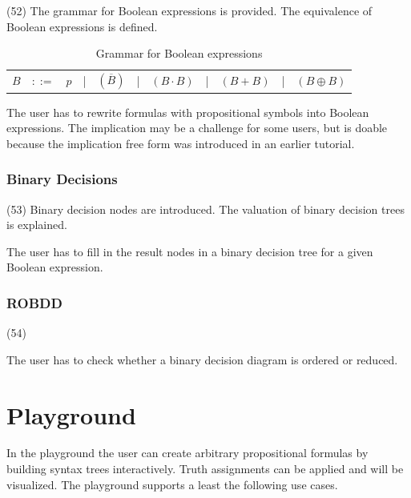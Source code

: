 (52) The grammar for Boolean expressions is provided. 
The equivalence of Boolean expressions is defined.

\begin{table}[htdp]
\begin{center}
\begin{tabular}{rcccccccccc}
$B$	&$::=$	&$p$ 	
	&|		& $(\overline{B})$ 
	&|		&  $(B \cdot B)$ 
	&|		&  $(B + B)$ 
	&|		&  $(B \oplus B)$ \\
\end{tabular}
\caption{Grammar for Boolean expressions}
\label{tab:BNFGRBE}
\end{center}
\end{table}

The user has to rewrite formulas with propositional symbols into Boolean expressions.
The implication may be a challenge for some users, 
but is doable because the implication free form was introduced 
in an earlier tutorial.

\subsubsection{Binary Decisions}
\label{tut:53}

(53) Binary decision nodes are introduced. 
The valuation of binary decision trees is explained.

The user has to fill in the result nodes in a binary decision tree for a given Boolean expression.

\subsubsection{ROBDD}
\label{tut:54}

(54)

The user has to check whether a binary decision diagram is ordered or reduced.

\section{Playground}

In the playground the user can create arbitrary propositional formulas 
by building syntax trees interactively.
Truth assignments can be applied and will be visualized.
The playground supports a least the following use cases.

